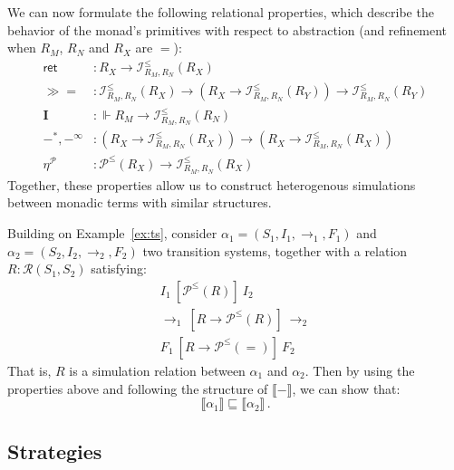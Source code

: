 \documentclass[acmsmall,timestamp,review,anonymous]{acmart}
\newcommand{\kw}[1]{\ensuremath{ \mathsf{#1} }}
\newcommand{\ifr}[1]{\ [{#1}]\ }
\newcommand{\bind}{\gg\!\!=}
\begin{document}
We can now formulate the following relational properties,
which describe the behavior of the monad's primitives
with respect to abstraction
(and refinement when $R_M$, $R_N$ and $R_X$ are $=$):
\begin{align*}
  \kw{ret} &:
    R_X \rightarrow \mathcal{I}^\le_{R_M,R_N}(R_X) \\
  \bind &:
    \mathcal{I}^\le_{R_M,R_N}(R_X) \rightarrow
    (R_X \rightarrow
     \mathcal{I}^\le_{R_M,R_N}(R_Y)) \rightarrow
    \mathcal{I}^\le_{R_M,R_N}(R_Y) \\
  \mathbf{I} &:
    {}\Vdash R_M \rightarrow
    \mathcal{I}^\le_{R_M,R_N}(R_N) \\
  -^*,
  -^\infty &:
    (R_X \rightarrow \mathcal{I}^\le_{R_M,R_N}(R_X)) \rightarrow
    (R_X \rightarrow \mathcal{I}^\le_{R_M,R_N}(R_X)) \\
  \eta^\mathcal{P} &:
    \mathcal{P}^\le(R_X) \rightarrow
    \mathcal{I}^\le_{R_M,R_N}(R_X)
\end{align*}
Together,
these properties allow us to construct
heterogenous simulations
between monadic terms with similar structures.

\begin{example} \label{ex:sim}
Building on Example~\ref{ex:ts},
consider
$\alpha_1 = (S_1, I_1, {\rightarrow}_1, F_1)$ and
$\alpha_2 = (S_2, I_2, {\rightarrow}_2, F_2)$
two transition systems,
together with a relation
$R : \mathcal{R}(S_1, S_2)$
satisfying:
\begin{gather*}
  I_1 \ifr{\mathcal{P}^\le(R)} I_2 \\
  {\rightarrow}_1 \ifr{R \rightarrow \mathcal{P}^\le(R)} {\rightarrow}_2 \\
  F_1 \ifr{R \rightarrow \mathcal{P}^\le(=)} F_2
\end{gather*}
That is, $R$ is a simulation relation between $\alpha_1$ and $\alpha_2$.
Then by using the properties above and
following the structure of $\llbracket - \rrbracket$,
we can show that:
\[
    \llbracket \alpha_1 \rrbracket \sqsubseteq
    \llbracket \alpha_2 \rrbracket \,.
\]
\end{example}


\subsection{Strategies} \label{sec:monad:games} %
\end{document}
